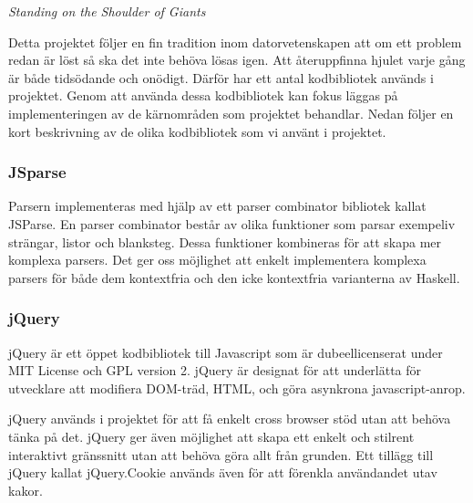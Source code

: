 \emph{Standing on the Shoulder of Giants}

Detta projektet följer en fin tradition inom datorvetenskapen att om ett problem redan är löst så ska det inte behöva lösas igen. Att återuppfinna hjulet varje gång är både tidsödande och onödigt. 
Därför har ett antal kodbibliotek används i projektet. 
Genom att använda dessa kodbibliotek kan fokus läggas på implementeringen av de kärnområden som projektet behandlar.
Nedan följer en kort beskrivning av de olika kodbibliotek som vi använt i projektet.

\subsubsection{JSparse}  
Parsern implementeras med hjälp av ett parser combinator bibliotek kallat JSParse. 
En parser combinator består av olika funktioner som parsar exempeliv strängar, listor och blanksteg. 
Dessa funktioner kombineras för att skapa mer komplexa parsers. Det ger oss möjlighet att enkelt implementera komplexa 
parsers för både dem kontextfria och den icke kontextfria varianterna av Haskell.

\subsubsection{jQuery} 

jQuery är ett öppet kodbibliotek till Javascript som är dubeellicenserat under MIT License och GPL version 2.  
jQuery är designat för att underlätta för utvecklare att modifiera DOM-träd, HTML, och göra asynkrona javascript-anrop.

jQuery används i projektet för att få enkelt cross browser stöd utan att behöva tänka på det. 
jQuery ger även möjlighet att skapa ett enkelt och stilrent interaktivt gränssnitt utan att behöva göra allt från grunden.
Ett tillägg till jQuery kallat jQuery.Cookie används även för att förenkla användandet utav kakor.

